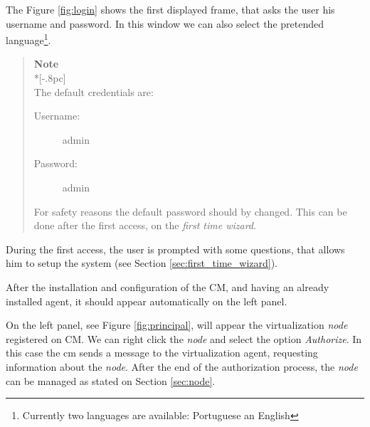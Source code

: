 
The Figure \ref{fig:login} shows the first displayed frame, that asks the user his username and password. In this window we can also select the pretended language\footnote{Currently two languages are available: Portuguese an English}.

\begin{quote}
	{\large \bf Note} \\*[-.8pc]
	\underline{\hspace{6in}} \\
    The default credentials are:
	\begin{description}
        	\item[Username:] admin
	        \item[Password:] admin
	\end{description}
    For safety reasons the default password should by changed. This can be done after the first access, on the \textit{first time wizard}.

\end{quote}

During the first access, the user is prompted with some questions, that allows him to setup the system (see Section \ref{sec:first_time_wizard}).

After the installation and configuration of the CM, and having an already installed agent, it should appear automatically on the left panel.

On the left panel, see Figure \ref{fig:principal}, will appear the virtualization \emph{node} registered on CM. We can right click the \emph{node} and select the option \emph{Authorize}. In this case the cm sends a message to the virtualization agent, requesting information about the \emph{node}. After the end of the authorization process, the \emph{node} can be managed as stated on Section \ref{sec:node}.

